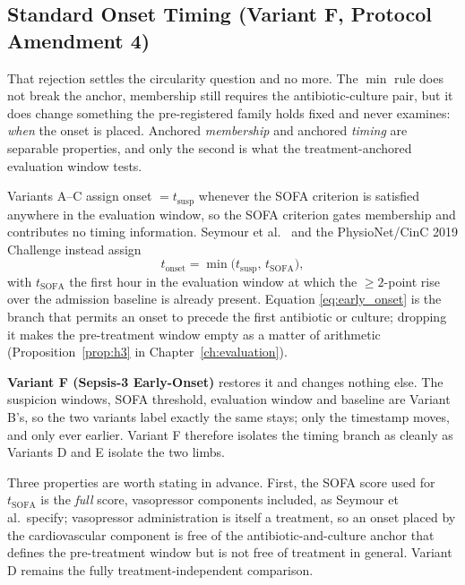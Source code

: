 \subsection{Standard Onset Timing (Variant F, Protocol Amendment 4)}
\label{sec:variant_f}

That rejection settles the circularity question and no more. The $\min$ rule
does not break the anchor, membership still requires the
antibiotic-culture pair, but it does change something the pre-registered
family holds fixed and never examines: \emph{when} the onset is placed. Anchored
\emph{membership} and anchored \emph{timing} are separable properties, and only
the second is what the treatment-anchored evaluation window tests.

Variants A--C assign onset $= t_{\text{susp}}$ whenever the SOFA criterion is
satisfied anywhere in the evaluation window, so the SOFA criterion gates
membership and contributes no timing information. Seymour et al.\ \cite{seymour2016assessment} and the PhysioNet/CinC 2019 Challenge
\cite{reyna2020utility} instead assign
\begin{equation}
    t_{\text{onset}} = \min\bigl(t_{\text{susp}},\, t_{\text{SOFA}}\bigr),
    \label{eq:early_onset}
\end{equation}
with $t_{\text{SOFA}}$ the first hour in the evaluation window at which the
$\geq 2$-point rise over the admission baseline is already present. Equation
\eqref{eq:early_onset} is the branch that permits an onset to precede the first
antibiotic or culture; dropping it makes the pre-treatment window empty as a
matter of arithmetic (Proposition~\ref{prop:h3} in
Chapter~\ref{ch:evaluation}).

\textbf{Variant F (Sepsis-3 Early-Onset)} restores it and changes nothing else.
The suspicion windows, SOFA threshold, evaluation window and baseline are
Variant B's, so the two variants label exactly the same stays; only the
timestamp moves, and only ever earlier. Variant F therefore isolates the timing
branch as cleanly as Variants D and E isolate the two limbs.

Three properties are worth stating in advance. First, the SOFA score used for
$t_{\text{SOFA}}$ is the \emph{full} score, vasopressor components included, as
Seymour et al.\ specify; vasopressor administration is itself a treatment, so an
onset placed by the cardiovascular component is free of the
antibiotic-and-culture anchor that defines the pre-treatment window but is not
free of treatment in general. Variant D remains the fully treatment-independent
comparison.

